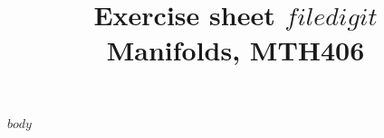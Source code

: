\documentclass[a4paper]{article}
\title{Exercise sheet $filedigit$\\ {\small Manifolds, MTH406} }
\date{}
\begin{document}
\maketitle
$body$
\end{document}
